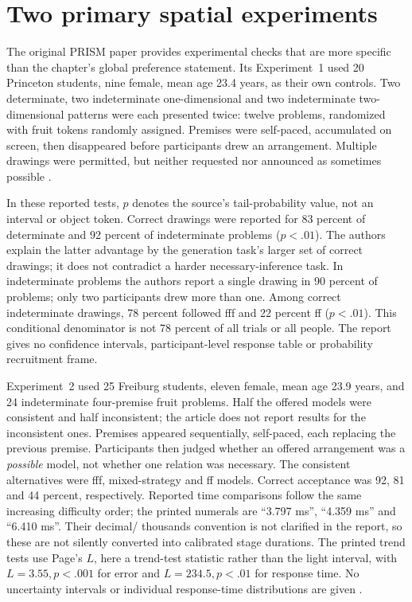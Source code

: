 \section{Two primary spatial experiments}
\label{sec:p19-rat132-spatial-evidence}

The original PRISM paper provides experimental checks that are more specific
than the chapter's global preference statement. Its Experiment~1 used
20 Princeton students, nine female, mean age 23.4 years, as their own
controls. Two determinate, two indeterminate one-dimensional and two
indeterminate two-dimensional patterns were each presented twice: twelve
problems, randomized with fruit tokens randomly assigned. Premises were
self-paced, accumulated on screen, then disappeared before participants
drew an arrangement. Multiple drawings were permitted, but neither
requested nor announced as sometimes possible
\cite[pp.~578--579,581, Experiment~1]{RagniKnauff2013PRISM}.

In these reported tests, \(p\) denotes the source's tail-probability
value, not an interval or object token. Correct drawings were reported
for 83 percent of determinate and 92 percent
of indeterminate problems (\(p<.01\)). The authors explain the latter
advantage by the generation task's larger set of correct drawings; it does
not contradict a harder necessary-inference task. In indeterminate problems
the authors report a single drawing in 90 percent of problems; only two participants drew
more than one. Among correct indeterminate drawings, 78 percent followed
fff and 22 percent ff (\(p<.01\)). This conditional denominator is not
78 percent of all trials or all people. The report gives no confidence
intervals, participant-level response table or probability recruitment frame.

Experiment~2 used 25 Freiburg students, eleven female, mean age 23.9 years,
and 24 indeterminate four-premise fruit problems. Half the offered models
were consistent and half inconsistent; the article does not report results
for the inconsistent ones. Premises appeared sequentially, self-paced, each
replacing the previous premise. Participants then judged whether an offered
arrangement was a \emph{possible} model, not whether one relation was
necessary. The consistent alternatives were fff, mixed-strategy and ff
models. Correct acceptance was 92, 81 and 44 percent, respectively. Reported
time comparisons follow the same increasing difficulty order; the printed
numerals are ``3.797 ms'', ``4.359 ms'' and ``6.410 ms''. Their decimal/
thousands convention is not clarified in the report, so these are not
silently converted into calibrated stage durations. The printed trend
tests use Page's \(L\), here a trend-test statistic rather than the
light interval, with \(L=3.55,p<.001\) for error and
\(L=234.5,p<.01\) for response time. No uncertainty intervals or
individual response-time distributions are given
\cite[p.~580, Experiment~2]{RagniKnauff2013PRISM}.

